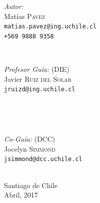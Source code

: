 \documentclass[12pt,letterpaper,spanish]{book}
\begin{document}
\begin{titlepage}
\begin{minipage}{0.4\textwidth}
\begin{flushleft} \large
\emph{Autor:}\\
Mat\'ias \textsc{Pavez}\\
\texttt{\normalsize matias.pavez@ing.uchile.cl} \\
\texttt{\normalsize +569 9888 9358}
\end{flushleft}
\end{minipage}
~
\begin{minipage}{0.4\textwidth}
\begin{flushright} \large
\emph{Profesor Gu\'ia:} (DIE) \\
Javier \textsc{Ruiz del Solar}\\
\texttt{\normalsize jruizd@ing.uchile.cl}
\end{flushright}
\end{minipage}\\[1cm]
\begin{minipage}{0.4\textwidth}
\begin{flushleft}\end{flushleft}
\end{minipage}
~
\begin{minipage}{0.4\textwidth}
\begin{flushright} \large
\emph{Co-Gu\'ia:} (DCC)\\
Jocelyn \textsc{Simmond}\\
\texttt{\normalsize jsimmond@dcc.uchile.cl}
\end{flushright}
\end{minipage}\\[2cm]
{\large Santiago de Chile}\\
{\large Abril, 2017}
\vfill
 
\end{titlepage}

\tableofcontents






\end{document}
